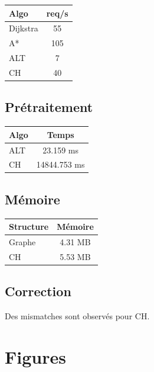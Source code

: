 \documentclass[11pt]{article}
\begin{document}
{\large
\renewcommand{\arraystretch}{1.2}
\begin{center}
\begin{tabular}{lc}
\hline
Algo & req/s \\
\hline
Dijkstra & 55 \\
A* & 105 \\
ALT & 7 \\
CH & 40 \\
\hline
\end{tabular}
\end{center}
}

\subsection{Prétraitement}

{\large
\renewcommand{\arraystretch}{1.2}
\begin{center}
\begin{tabular}{lc}
\hline
Algo & Temps \\
\hline
ALT & 23.159 ms \\
CH & 14844.753 ms \\
\hline
\end{tabular}
\end{center}
}

\subsection{Mémoire}

{\large
\renewcommand{\arraystretch}{1.2}
\begin{center}
\begin{tabular}{lc}
\hline
Structure & Mémoire \\
\hline
Graphe & 4.31 MB \\
CH & 5.53 MB \\
\hline
\end{tabular}
\end{center}
}

\subsection{Correction}

Des mismatches sont observés pour CH.

\section{Figures}
\end{document}
